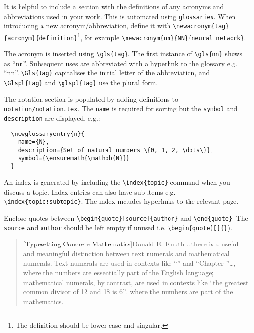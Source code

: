 

It is helpful to include a section with the definitions of any acronyms and abbreviations
used in your work. This is automated using \href{https://ctan.org/pkg/glossaries}{\texttt{glossaries}}.
When introducing a new acronym/abbreviation, define it with \verb|\newacronym{tag}{acronym}{definition}|\footnote{The 
definition should be lower case and singular.}, for example \verb|\newacronym{nn}{NN}{neural network}|.

The acronym is inserted using \verb|\gls{tag}|. The first instance of \verb|\gls{nn}| shows
as ``\gls{nn}''. Subsequent uses are abbreviated with a hyperlink to the glossary e.g. ``\gls{nn}''.
\verb|\Gls{tag}| capitalises the initial letter of the abbreviation, and \verb|\Glspl{tag}|
and \verb|\glspl{tag}| use the plural form.

The notation section is populated by adding definitions to \texttt{notation/notation.tex}.
The \texttt{name} is required for sorting but the \texttt{symbol} and \texttt{description}
are displayed, e.g.:
\begin{verbatim}
  \newglossaryentry{n}{
    name={N},
    description={Set of natural numbers \{0, 1, 2, \dots\}},
    symbol={\ensuremath{\mathbb{N}}}
  }
\end{verbatim}


An index is generated by including the \verb|\index{topic}| command when you discuss a topic.
Index entries can also have sub-items e.g. \verb|\index{topic!subtopic}|. The index includes
hyperlinks to the relevant page.


Enclose quotes between \verb|\begin{quote}[source]{author}| and \verb|\end{quote}|. The
\texttt{source} and \texttt{author} should be left empty if unused i.e. \verb|\begin{quote}[]{}|).

\begin{quote}[\href{https://www.tug.org/TUGboat/Articles/tb10-1/tb23knut.pdf}{Typesetting Concrete Mathematics}]{Donald E. Knuth}
  \dots there is a useful and meaningful distinction between text numerals and mathematical
  numerals. Text numerals are used in contexts like ``'' and ``Chapter ''\dots,
  where the numbers are essentially part of the English language; mathematical numerals, by contrast,
  are used in contexts like ``the greatest common divisor of 12 and 18 is 6'', where the numbers
  are part of the mathematics.
\end{quote}

